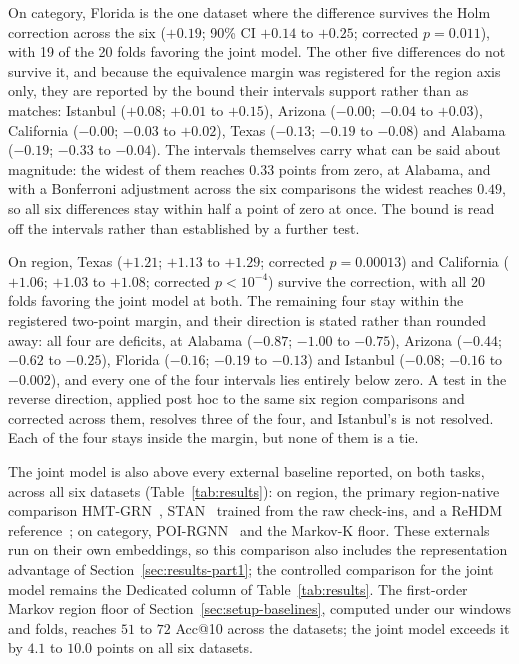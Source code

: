 On category, Florida is the one dataset where the difference survives the
Holm correction across the six ($+0.19$; 90\% CI $+0.14$ to $+0.25$; corrected $p=0.011$), with 19 of the
20 folds favoring the joint model. The other five differences do not survive it, and because the
equivalence margin was registered for the region axis only, they are reported by the bound their intervals support
rather than as matches: Istanbul ($+0.08$; $+0.01$ to $+0.15$), Arizona ($-0.00$; $-0.04$ to
$+0.03$), California ($-0.00$; $-0.03$ to $+0.02$), Texas ($-0.13$; $-0.19$ to $-0.08$) and Alabama
($-0.19$; $-0.33$ to $-0.04$).
The intervals themselves carry what can be said about magnitude:
the widest of them reaches $0.33$ points from zero, at Alabama, and with a Bonferroni adjustment
across the six comparisons the widest reaches $0.49$, so all six differences stay within half a point
of zero at once.
The bound is read off the intervals rather than established by a
further test.

On region, Texas ($+1.21$; $+1.13$ to $+1.29$; corrected $p=0.00013$) and California ($+1.06$;
$+1.03$ to $+1.08$; corrected $p<10^{-4}$) survive the correction, with all 20 folds favoring the
joint model at both. The remaining four stay within the registered two-point margin, and their
direction is stated rather than rounded away: all four are deficits, at Alabama ($-0.87$; $-1.00$
to $-0.75$), Arizona ($-0.44$; $-0.62$ to $-0.25$), Florida ($-0.16$; $-0.19$ to $-0.13$) and
Istanbul ($-0.08$; $-0.16$ to $-0.002$), and every one of the four intervals lies entirely below
zero. A test in the reverse direction, applied post hoc to the same six region comparisons and
corrected across them, resolves three of the four, and Istanbul's is not resolved. Each of the four
stays inside the margin, but none of them is a tie.


The joint model is also above every external baseline reported, on both tasks,
across all six datasets (Table~\ref{tab:results}): on region, the primary
region-native comparison HMT-GRN~\cite{lim2022hmtgrn}, STAN~\cite{luo2021stan}
trained from the raw check-ins, and a ReHDM reference~\cite{li2025rehdm}; on
category, POI-RGNN~\cite{capanema2023poirgnn} and the Markov-K floor. These externals run on their own embeddings, so this comparison
also includes the representation advantage of Section~\ref{sec:results-part1}; the
controlled comparison for the joint model remains the Dedicated column of
Table~\ref{tab:results}. The first-order Markov region floor of Section~\ref{sec:setup-baselines},
computed under our windows and folds, reaches $51$ to $72$ Acc@10 across the
datasets; the joint model exceeds it by $4.1$ to $10.0$ points on all six
datasets.

